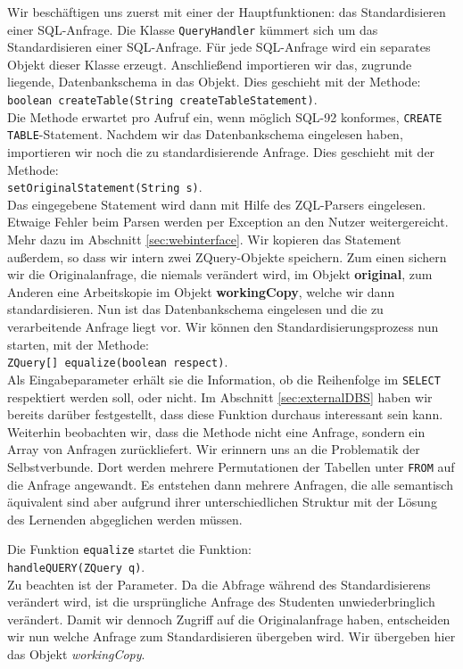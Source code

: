 Wir beschäftigen uns zuerst mit einer der Hauptfunktionen: das Standardisieren einer SQL-Anfrage. Die Klasse \verb|QueryHandler| kümmert sich um das Standardisieren einer SQL-Anfrage. Für jede SQL-Anfrage wird ein separates Objekt dieser Klasse erzeugt. Anschließend importieren wir das, zugrunde liegende, Datenbankschema in das Objekt. Dies geschieht mit der Methode: \\\verb|boolean createTable(String createTableStatement)|.\\
Die Methode erwartet pro Aufruf ein, wenn möglich SQL-92 konformes, \verb|CREATE TABLE|-Statement. Nachdem wir das Datenbankschema eingelesen haben, importieren wir noch die zu standardisierende Anfrage. Dies geschieht mit der Methode:\\\verb|setOriginalStatement(String s)|.\\ Das eingegebene Statement wird dann mit Hilfe des ZQL-Parsers eingelesen. Etwaige Fehler beim Parsen werden per Exception an den Nutzer weitergereicht. Mehr dazu im Abschnitt \ref{sec:webinterface}. Wir kopieren das Statement außerdem, so dass wir intern zwei ZQuery-Objekte speichern. Zum einen sichern wir die Originalanfrage, die niemals verändert wird, im Objekt \textbf{original}, zum Anderen eine Arbeitskopie im Objekt \textbf{workingCopy}, welche wir dann standardisieren. Nun ist das Datenbankschema eingelesen und die zu verarbeitende Anfrage liegt vor. Wir können den Standardisierungsprozess nun starten, mit der Methode: \\\verb|ZQuery[] equalize(boolean respect)|.\\ 
Als Eingabeparameter erhält sie die Information, ob die Reihenfolge im \verb|SELECT| respektiert werden soll, oder nicht. Im Abschnitt \ref{sec:externalDBS} haben wir bereits darüber festgestellt, dass diese Funktion durchaus interessant sein kann. Weiterhin beobachten wir, dass die Methode nicht eine Anfrage, sondern ein Array von Anfragen zurückliefert. Wir erinnern uns an die Problematik der Selbstverbunde. Dort werden mehrere Permutationen der Tabellen unter \verb|FROM| auf die Anfrage angewandt. Es entstehen dann mehrere Anfragen, die alle semantisch äquivalent sind 
aber aufgrund ihrer unterschiedlichen Struktur mit der Lösung des Lernenden abgeglichen werden müssen.

Die Funktion \verb|equalize| startet die Funktion:\\
\verb|handleQUERY(ZQuery q)|.\\Zu beachten ist der Parameter. Da die Abfrage während des Standardisierens verändert wird, ist die ursprüngliche Anfrage des Studenten unwiederbringlich verändert. Damit wir dennoch Zugriff auf die Originalanfrage haben, entscheiden wir nun welche Anfrage zum Standardisieren übergeben wird. Wir übergeben hier das Objekt \textit{workingCopy}.

